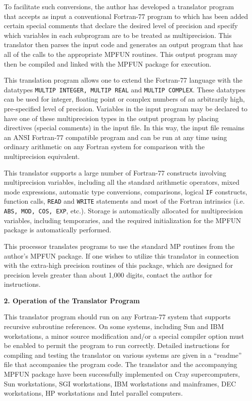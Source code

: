 To facilitate such conversions, the author has developed a translator
program that accepts as input a conventional Fortran-77 program to
which has been added certain special comments that declare the desired
level of precision and specify which variables in each subprogram are
to be treated as multiprecision.  This translator then parses the
input code and generates an output program that has all of the calls
to the appropriate MPFUN routines.  This output program may then be
compiled and linked with the MPFUN package for execution.

This translation program allows one to extend the Fortran-77 language
with the datatypes {\tt MULTIP INTEGER, MULTIP REAL} and {\tt MULTIP
COMPLEX}.  These datatypes can be used for integer, floating point or
complex numbers of an arbitrarily high, pre-specified level of
precision.  Variables in the input program may be declared to have one
of these multiprecision types in the output program by placing
directives (special comments) in the input file.  In this way, the
input file remains an ANSI Fortran-77 compatible program and can be
run at any time using ordinary arithmetic on any Fortran system for
comparison with the multiprecision equivalent.
 
This translator supports a large number of Fortran-77 constructs
involving multiprecision variables, including all the standard
arithmetic operators, mixed mode expressions, automatic type
conversions, comparisons, logical {\tt IF} constructs, function calls,
{\tt READ} and {\tt WRITE} statements and most of the Fortran
intrinsics (i.e. {\tt ABS, MOD, COS, EXP}, etc.).  Storage is
automatically allocated for multiprecision variables, including
temporaries, and the required initialization for the MPFUN package is
automatically performed.
 
This processor translates programs to use the standard MP routines
from the author's MPFUN package.  If one wishes to utilize this
translator in connection with the extra-high precision routines of
this package, which are designed for precision levels greater than
about 1,000 digits, contact the author for instructions.
 
\vspace{2ex} \noindent
{\bf 2. Operation of the Translator Program}

This translator program should run on any Fortran-77 system that
supports recursive subroutine references.  On some systems, including
Sun and IBM workstations, a minor source modification and/or a special
compiler option must be enabled to permit the program to run
correctly.  Detailed instructions for compiling and testing the
translator on various systems are given in a ``readme'' file that
accompanies the program code.  The translator and the accompanying
MPFUN package have been successfully implemented on Cray
supercomputers, Sun workstations, SGI workstations, IBM workstations
and mainframes, DEC workstations, HP workstations and Intel parallel
computers.

